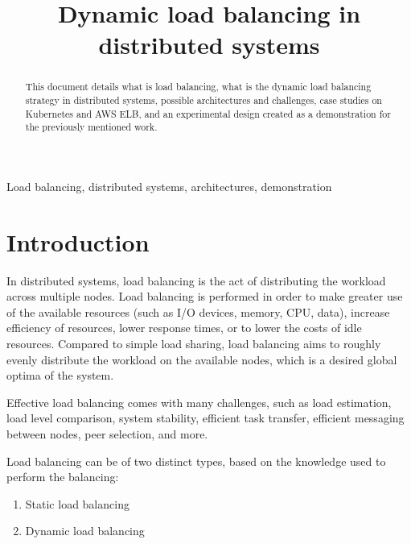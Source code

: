 \documentclass[conference]{IEEEtran}
\begin{document}
\title{Dynamic load balancing in distributed systems}

\author{
}
\maketitle

\begin{abstract}
    This document details what is load balancing, what is the dynamic load balancing strategy in distributed systems,
    possible architectures and challenges, case studies on Kubernetes and AWS ELB, and an experimental design created as a demonstration for the previously mentioned work.
\end{abstract}

\begin{IEEEkeywords}
    Load balancing, distributed systems, architectures, demonstration
\end{IEEEkeywords}

\section{Introduction}
    In distributed systems, load balancing is the act of distributing the workload across multiple nodes. Load balancing
is performed in order to make greater use of the available resources (such as I/O devices, memory, CPU, data), increase efficiency
of resources, lower response times, or to lower the costs of idle resources. Compared to simple load sharing, load balancing
aims to roughly evenly distribute the workload on the available nodes, which is a desired global optima of the system.

    Effective load balancing comes with many challenges, such as load estimation, load level comparison, system stability,
efficient task transfer, efficient messaging between nodes, peer selection, and more.

    Load balancing can be of two distinct types, based on the knowledge used to perform the balancing:

    \begin{enumerate}
        \item Static load balancing
        \item Dynamic load balancing
    \end{enumerate}
\end{document}
